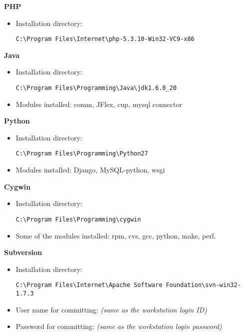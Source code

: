 \textbf{PHP}
\begin{itemize}
\item Installation directory: \begin{verbatim}C:\Program Files\Internet\php-5.3.10-Win32-VC9-x86\end{verbatim}
\end{itemize}
\textbf{Java}
\begin{itemize}
\item Installation directory: \begin{verbatim}C:\Program Files\Programming\Java\jdk1.6.0_20\end{verbatim}
\item Modules installed: comm, JFlex, cup, mysql connector
\end{itemize}
\textbf{Python}
\begin{itemize}
\item Installation directory: \begin{verbatim}C:\Program Files\Programming\Python27\end{verbatim}
\item Modules installed: Django, MySQL-python, wsgi
\end{itemize}
\textbf{Cygwin}
\begin{itemize}
\item Installation directory: \begin{verbatim}C:\Program Files\Programming\cygwin\end{verbatim}
\item Some of the modules installed: rpm, cvs, gcc, python, make, perl.
\end{itemize}
\textbf{Subversion}
\begin{itemize}
\item Installation directory: \begin{verbatim}C:\Program Files\Internet\Apache Software Foundation\svn-win32-1.7.3\end{verbatim}
\item User name for committing: \emph{(same as the workstation login ID)}
\item Password for committing: \emph{(same as the workstation login password)}
\end{itemize}